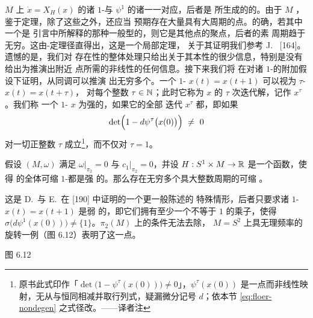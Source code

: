 $M$ 上 $\dot{x}=X_{H}(x)$ 的诸 $1$-\trPeriodicSolution{}与\trHamiltonianMap{}%
$\psi^{1}$ 的诸\trFixedPoint{}一一对应，后者是%
\trHamiltonianVectorField{}所生成的\trFlow{}的\trTimeOneMap。由于 $M$%
\trCompact，鉴于\trPoincare{}\trRecurrence{}定理，除了这些\trFixedPoint{}之外，还应当%
预期存在大量具有大周期的\trPeriodic{}点。的确，若其中一个\trFixedPoint{}是%
引言中所解释的那种一般\trElliptic{}型的，则它是其他\trPeriodic{}点的聚点，后者的素%
周期趋于无穷。这由\trBirkhoff-\trLewis{}定理径直得出，这是一个局部定理，%
关于其证明我们参考 J.~\trMoser{} [164]。遗憾的是，我们对\trFixedPoint{}%
存在性的整体处理只给出关于其本性的很少信息，特别是没有给出为推演出附近%
\trPeriodic{}点所需的非线性\trBirkhoffInvariant{}的任何信息。接下来我们将%
在对诸 $1$-\trPeriodicSolution{}的附加假设下证明，从\trFloer{}同调可以推演%
出无穷多个\trPeriodicSolution。一个 $1$-\trPeriodicSolution{}%
$x(t)=x(t+1)$ 可以视为 $\tau$-\trPeriodicSolution{} $x(t)=x(t+\tau)$，%
对每个整数 $\tau\in\mathbb{N}$；此时它称为 $x$ 的 $\tau$ 次迭代解，记作 $x^{\tau}$。我们称%
一个 $1$-\trPeriodicSolution{} $x$ 为强\trNondegenerate{}的，如果它的全部%
迭代 $x^{\tau}$ 都\trNondegenerate，即如果
\[
\det\Bigl(1-d\psi^{\tau}\bigl(x(0)\bigr)\Bigr)\ \neq\ 0
\]
对一切正整数 $\tau$ 成立\footnote{原书此式印作「$\det\bigl(1-\psi^{\tau}(x(0))\bigr)\neq0$」，$\psi^{\tau}(x(0))$ 是一点而非线性映射，无从与恒同相减并取行列式，疑漏微分记号 $d$；依本节 \eqref{eq:floer-nondegen} 之式径改。——译者注}，而不仅对 $\tau=1$。

\begin{theorem}\label{thm:strongly-nondegenerate-infinite}
假设\trCompact\trSymplecticManifold{} $(M,\omega)$ 满足%
$\omega\big|_{\pi_{2}}=0$ 与 $c_{1}\big|_{\pi_{2}}=0$，并设%
$H:S^{1}\times M\to\mathbb{R}$ 是一个\trSmooth\trHamiltonian{}函数，使得%
\trHamiltonianSystem{}的全体可缩 $1$-\trPeriodicSolution{}都是强%
\trNondegenerate{}的。那么存在无穷多个具大整数周期的可缩%
\trPeriodicSolution。
\end{theorem}

这是 D.~\trSalamon{}与 E.~\trZehnder{}在 [190] 中证明的一个更一般陈述的%
特殊情形，后者只要求诸 $1$-\trPeriodicSolution{} $x(t)=x(t+1)$ 是弱%
\trNondegenerate{}的，即它们拥有至少一个不等于 $1$ 的\trFloquet{}乘子，使得%
$\sigma\bigl(d\psi^{1}(x(0))\bigr)\neq\{1\}$。$\pi_{2}(M)$ 上的条件无法去除，%
$M=S^{2}$ 上具无理频率的旋转一例（图 6.12）表明了这一点。

\noindent\begin{minipage}{\linewidth}
\centering
{}

图 6.12
\end{minipage}

